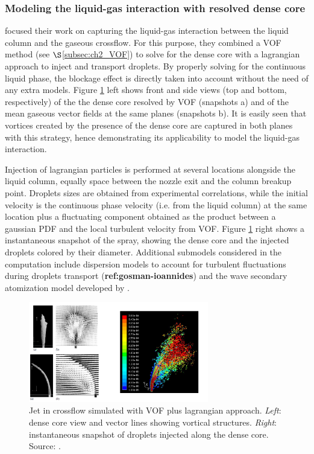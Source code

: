 \subsubsection*{Modeling the liquid-gas interaction with resolved dense core }

 focused their work on capturing the liquid-gas interaction between the liquid column and the gaseous crossflow. For this purpose, they combined a VOF method (see $\S$\ref{subsec:ch2_VOF}) to solve for the dense core with a lagrangian approach to inject and transport droplets. By properly solving for the continuous liquid phase, the blockage effect is directly taken into account without the need of any extra models. Figure \ref{fig:arienti_2006_jicf} left shows front and side views (top and bottom, respectively) of the the dense core resolved by VOF (snapshots a) and of the mean gaseous vector fields at the same planes (snapshots b). It is easily seen that vortices created by the presence of the dense core are captured in both planes with this strategy, hence demonstrating its applicability to model the liquid-gas interaction.

Injection of lagrangian particles is performed at several locations alongside the liquid column, equally space between the nozzle exit and the column breakup point. Droplets sizes are obtained from experimental correlations, while the initial velocity is the continuous phase velocity (i.e. from the liquid column) at the same location plus a fluctuating component obtained as the product between a gaussian PDF and the local turbulent velocity from VOF. Figure \ref{fig:arienti_2006_jicf} right shows a instantaneous snapshot of the spray, showing the dense core and the injected droplets colored by their diameter. Additional submodels considered in the computation include dispersion models to account for turbulent fluctuations during droplets transport (\textbf{ref:gosman-ioannides}) and the wave secondary atomization model developed by .


\begin{figure}[ht]
    \centering
    \includegraphics[width=0.7\textwidth]{./part1_numerical_approaches/figures_ch3/arienti_2006_jicf}
       \centering
    \caption{Jet in crossflow simulated with VOF plus lagrangian approach. \textsl{Left}: dense core view and vector lines showing vortical structures. \textsl{Right}: instantaneous snapshot of droplets injected along the dense core. Source: .}
    \label{fig:arienti_2006_jicf}
\end{figure}


